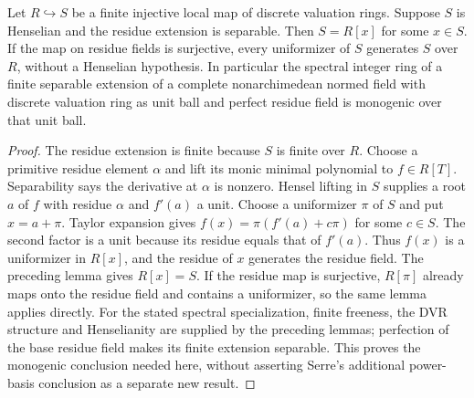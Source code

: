 \begin{lemma}
\label{fw:henselian-integral-generation}
\leanok
Let $R\hookrightarrow S$ be a finite injective local map of discrete
valuation rings. Suppose $S$ is Henselian and the residue extension is
separable. Then $S=R[x]$ for some $x\in S$.
If the map on residue fields is surjective, every uniformizer of $S$
generates $S$ over $R$, without a Henselian hypothesis.
In particular the spectral integer ring of a finite separable extension
of a complete nonarchimedean normed field with discrete valuation ring
as unit ball and perfect residue field is monogenic over that unit ball.
\end{lemma}
\begin{proof}
The residue extension is finite because $S$ is finite over $R$.
Choose a primitive residue element $\alpha$ and lift its monic minimal
polynomial to $f\in R[T]$. Separability says the derivative at $\alpha$
is nonzero. Hensel lifting in $S$ supplies a root $a$ of $f$ with residue
$\alpha$ and $f'(a)$ a unit. Choose a uniformizer $\pi$ of $S$ and put
$x=a+\pi$. Taylor expansion gives
$f(x)=\pi(f'(a)+c\pi)$ for some $c\in S$. The second factor is a unit
because its residue equals that of $f'(a)$. Thus $f(x)$ is a uniformizer
in $R[x]$, and the residue of $x$ generates the residue field. The
preceding lemma gives $R[x]=S$.
If the residue map is surjective, $R[\pi]$ already maps onto the residue
field and contains a uniformizer, so the same lemma applies directly.
For the stated spectral specialization, finite freeness, the DVR
structure and Henselianity are supplied by the preceding lemmas;
perfection of the base residue field makes its finite extension separable.
This proves the monogenic conclusion needed here, without asserting
Serre's additional power-basis conclusion as a separate new result.
\end{proof}

